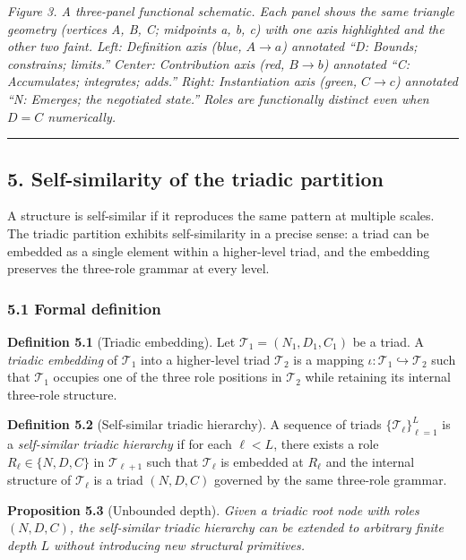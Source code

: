\documentclass[
  11pt,
  letterpaper,
]{article}
\begin{document}
\emph{Figure 3. A three-panel functional schematic. Each panel shows the
same triangle geometry (vertices A, B, C; midpoints a, b, c) with one
axis highlighted and the other two faint. Left: Definition axis (blue,
\(A \to a\)) annotated ``D: Bounds; constrains; limits.'' Center:
Contribution axis (red, \(B \to b\)) annotated ``C: Accumulates;
integrates; adds.'' Right: Instantiation axis (green, \(C \to c\))
annotated ``N: Emerges; the negotiated state.'' Roles are functionally
distinct even when \(D = C\) numerically.}

\begin{center}\rule{0.5\linewidth}{0.5pt}\end{center}

\subsection{5. Self-similarity of the triadic
partition}\label{self-similarity-of-the-triadic-partition}

A structure is self-similar if it reproduces the same pattern at
multiple scales. The triadic partition exhibits self-similarity in a
precise sense: a triad can be embedded as a single element within a
higher-level triad, and the embedding preserves the three-role grammar
at every level.

\subsubsection{5.1 Formal definition}\label{formal-definition}

\textbf{Definition 5.1} (Triadic embedding). Let
\(\mathcal{T}_1 = (N_1, D_1, C_1)\) be a triad. A \emph{triadic
embedding} of \(\mathcal{T}_1\) into a higher-level triad
\(\mathcal{T}_2\) is a mapping
\(\iota: \mathcal{T}_1 \hookrightarrow \mathcal{T}_2\) such that
\(\mathcal{T}_1\) occupies one of the three role positions in
\(\mathcal{T}_2\) while retaining its internal three-role structure.

\textbf{Definition 5.2} (Self-similar triadic hierarchy). A sequence of
triads \(\{\mathcal{T}_\ell\}_{\ell=1}^{L}\) is a \emph{self-similar
triadic hierarchy} if for each \(\ell < L\), there exists a role
\(R_\ell \in \{N, D, C\}\) in \(\mathcal{T}_{\ell+1}\) such that
\(\mathcal{T}_\ell\) is embedded at \(R_\ell\) and the internal
structure of \(\mathcal{T}_\ell\) is a triad \((N, D, C)\) governed by
the same three-role grammar.

\textbf{Proposition 5.3} (Unbounded depth). \emph{Given a triadic root
node with roles \((N, D, C)\), the self-similar triadic hierarchy can be
extended to arbitrary finite depth \(L\) without introducing new
structural primitives.}
\end{document}
